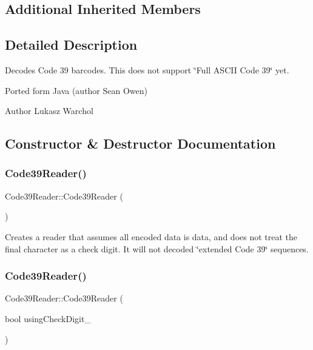 \subsection*{Additional Inherited Members}


\subsection{Detailed Description}
Decodes Code 39 barcodes. This does not support \char`\"{}\+Full A\+S\+C\+I\+I Code 39\char`\"{} yet.

Ported form Java (author Sean Owen) \begin{DoxyAuthor}{Author}
Lukasz Warchol 
\end{DoxyAuthor}


\subsection{Constructor \& Destructor Documentation}
\mbox{\label{classzxing_1_1oned_1_1_code39_reader_a0690215eb4af5f6378aeed64f81e75b1}} 
\subsubsection{\texorpdfstring{Code39\+Reader()}{Code39Reader()}\hspace{0.1cm}{\footnotesize\ttfamily [1/2]}}
{\footnotesize\ttfamily Code39\+Reader\+::\+Code39\+Reader (\begin{DoxyParamCaption}{ }\end{DoxyParamCaption})}

Creates a reader that assumes all encoded data is data, and does not treat the final character as a check digit. It will not decoded \char`\"{}extended
\+Code 39\char`\"{} sequences. \mbox{\label{classzxing_1_1oned_1_1_code39_reader_ad003a8b2f37b92ff49b43263ea9c431c}} 
\subsubsection{\texorpdfstring{Code39\+Reader()}{Code39Reader()}\hspace{0.1cm}{\footnotesize\ttfamily [2/2]}}
{\footnotesize\ttfamily Code39\+Reader\+::\+Code39\+Reader (\begin{DoxyParamCaption}\item[{bool}]{using\+Check\+Digit\+\_\+ }\end{DoxyParamCaption})}

